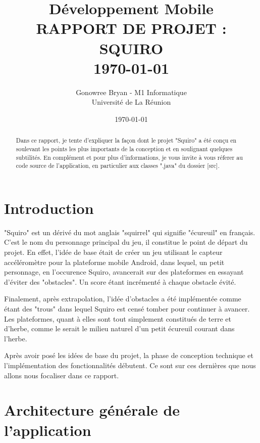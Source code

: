 \documentclass[12pt,a4paper,abstract=on,parskip=full]{scrartcl}
\title{ \normalsize Développement Mobile
        \HRule{0.5pt} \\ [0.5cm]
        \LARGE \textbf{\uppercase{Rapport de projet : SQUIRO}}
        \HRule{0.5pt} \\ [0.5cm]
        \normalsize \today \vspace*{5\baselineskip}}
\author{Gonowree Bryan - M1 Informatique \\ [0.5cm]
		Université de La Réunion}
\date{\today}
\begin{document}
\maketitle
\bigskip
\begin{abstract}
Dans ce rapport, je tente d'expliquer la façon dont le projet "Squiro" a été conçu en soulevant les points les plus importants de la conception et en soulignant quelques subtilités. En complément et pour plus d'informations, je vous invite à vous réferer au code source de l'application, en particulier aux classes ".java" du dossier [src].
\end{abstract}

\thispagestyle{empty}

\clearpage

\tableofcontents

\section*{Introduction}

"Squiro" est un dérivé du mot anglais "squirrel" qui signifie "écureuil" en français. C'est le nom du personnage principal du jeu, il constitue le point de départ du projet.
En effet, l'idée de base était de créer un jeu utilisant le capteur accéléromètre pour la plateforme mobile Android, dans lequel, un petit personnage, en l'occurence Squiro, avancerait sur des plateformes en essayant d'éviter des "obstacles". Un score étant incrémenté à chaque obstacle évité.

Finalement, après extrapolation, l'idée d'obstacles a été implémentée comme étant des "trous" dans lequel Squiro est censé tomber pour continuer à avancer. Les plateformes, quant à elles sont tout simplement constitués
de terre et d'herbe, comme le serait le milieu naturel d'un petit écureuil courant dans l'herbe. 

Après avoir posé les idées de base du projet,
la phase de conception technique et l'implémentation des fonctionnalités débutent.
Ce sont sur ces dernières que nous allons nous focaliser dans ce rapport.

\setcounter{page}{1}
\section{Architecture générale de l'application}
\end{document}
